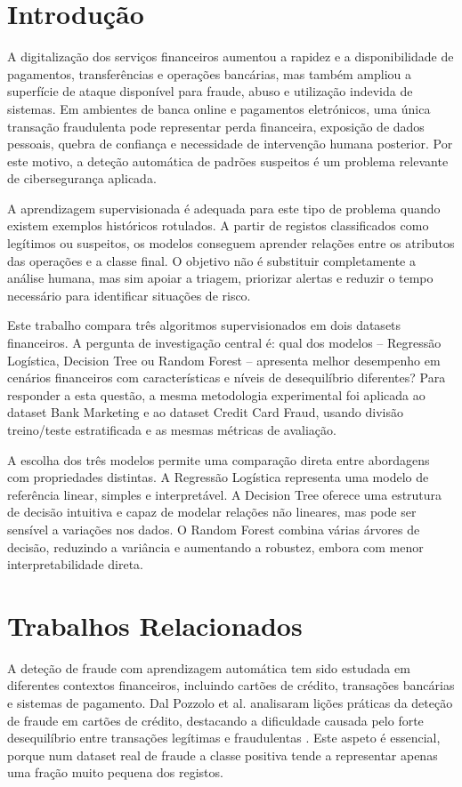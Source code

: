 \documentclass[10pt,twocolumn]{article}
\begin{document}
\section{Introdução}
A digitalização dos serviços financeiros aumentou a rapidez e a disponibilidade de pagamentos, transferências e operações bancárias, mas também ampliou a superfície de ataque disponível para fraude, abuso e utilização indevida de sistemas. Em ambientes de banca online e pagamentos eletrónicos, uma única transação fraudulenta pode representar perda financeira, exposição de dados pessoais, quebra de confiança e necessidade de intervenção humana posterior. Por este motivo, a deteção automática de padrões suspeitos é um problema relevante de cibersegurança aplicada.

A aprendizagem supervisionada é adequada para este tipo de problema quando existem exemplos históricos rotulados. A partir de registos classificados como legítimos ou suspeitos, os modelos conseguem aprender relações entre os atributos das operações e a classe final. O objetivo não é substituir completamente a análise humana, mas sim apoiar a triagem, priorizar alertas e reduzir o tempo necessário para identificar situações de risco.

Este trabalho compara três algoritmos supervisionados em dois datasets financeiros. A pergunta de investigação central é: qual dos modelos -- Regressão Logística, Decision Tree ou Random Forest -- apresenta melhor desempenho em cenários financeiros com características e níveis de desequilíbrio diferentes? Para responder a esta questão, a mesma metodologia experimental foi aplicada ao dataset Bank Marketing e ao dataset Credit Card Fraud, usando divisão treino/teste estratificada e as mesmas métricas de avaliação.

A escolha dos três modelos permite uma comparação direta entre abordagens com propriedades distintas. A Regressão Logística representa uma modelo de referência linear, simples e interpretável. A Decision Tree oferece uma estrutura de decisão intuitiva e capaz de modelar relações não lineares, mas pode ser sensível a variações nos dados. O Random Forest combina várias árvores de decisão, reduzindo a variância e aumentando a robustez, embora com menor interpretabilidade direta.

\section{Trabalhos Relacionados}
A deteção de fraude com aprendizagem automática tem sido estudada em diferentes contextos financeiros, incluindo cartões de crédito, transações bancárias e sistemas de pagamento. Dal Pozzolo et al. analisaram lições práticas da deteção de fraude em cartões de crédito, destacando a dificuldade causada pelo forte desequilíbrio entre transações legítimas e fraudulentas \cite{dalpozzolo2014credit}. Este aspeto é essencial, porque num dataset real de fraude a classe positiva tende a representar apenas uma fração muito pequena dos registos.
\end{document}

